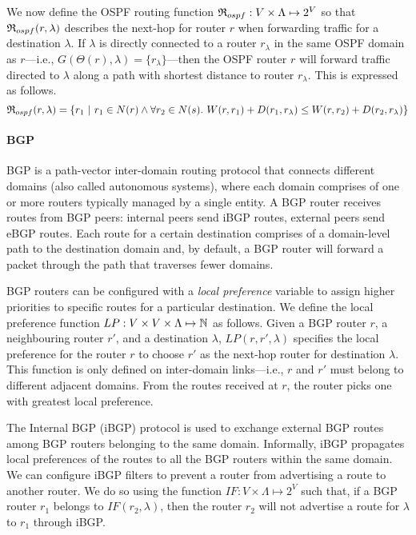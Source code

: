 We now define the OSPF routing function $\mathfrak{R}_{ospf}: 
V \times \Lambda \mapsto 2^V$ so that
$\mathfrak{R}_{ospf}(r,\lambda)$
 describes the next-hop for
router $r$ when forwarding traffic for a destination $\lambda$. 
If $\lambda$ is directly connected to a router $r_\lambda$ in the same OSPF domain as 
$r$---i.e., $G(\Theta(r),\lambda) = \{r_\lambda\}$---then 
the OSPF router $r$ will forward traffic directed to $\lambda$ along a path with
shortest distance to router $r_\lambda$. This is expressed as follows. 
\[
\mathfrak{R}_{ospf}(r,\lambda) = \{r_1 ~|~ r_1 \in N(r)\wedge \forall r_2 \in N(s) .~W(r, r_1) + D(r_1, r_\lambda) \le 
W(r, r_2) + D(r_2, r_\lambda)\}
\]
\paragraph{BGP} BGP is a path-vector inter-domain routing protocol
that connects different domains (also called autonomous systems), where each domain
comprises of one or more routers typically managed by a single
entity. A BGP router receives routes from BGP peers: internal peers
send iBGP routes, external peers send eBGP routes. Each route for 
a certain
destination comprises of a domain-level path to the destination
domain and, by default, a BGP router will forward a packet through the path that traverses fewer domains.
 
BGP routers can be configured with a
\emph{local preference} variable to assign higher priorities to
specific routes for a particular destination. We define the local
preference function $LP: V \times V \times \Lambda \mapsto \mathbb{N}$ as
follows.  Given a BGP router $r$, a neighbouring router $r'$, and  
a destination $\lambda$, $LP(r, r', \lambda)$ specifies the local
preference for the router $r$ to choose $r'$ as the next-hop router for destination $\lambda$.  This function is only defined
on inter-domain links---i.e., $r$ and $r'$ must belong to different adjacent domains.  
From the routes received at $r$, the router
picks one with greatest local preference.

The Internal BGP (iBGP) protocol is used to 
exchange external BGP routes 
among BGP routers belonging
to the same domain. Informally, iBGP propagates local preferences of the routes to all the BGP routers within the same domain. 
We can configure iBGP 
filters to prevent a router from advertising 
a route to another router. We do so using the 
function $IF: V \times \Lambda \mapsto 2^V$
such that,
if a BGP router $r_1$ belongs to  $IF(r_2, \lambda)$, then
the router $r_2$ will not advertise a route for $\lambda$ to
$r_1$ through iBGP. 
 
